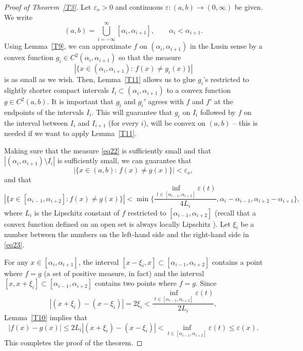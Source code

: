 \documentclass[intlimits,12pt,reqno]{amsart}
\newcommand{\eps}{\varepsilon}
\theoremstyle{definition}
\begin{document}
\begin{proof}[Proof of Theorem~\ref{T3}]
Let $\eps_o>0$ and continuous $\eps:(a,b)\to (0,\infty)$ be given. We write
$$
(a,b)=\bigcup_{i=-\infty}^\infty [\alpha_i,\alpha_{i+1}],
\qquad
\alpha_i<\alpha_{i+1}.
$$
Using Lemma~\ref{T9}, we can approximate $f$ on $(\alpha_i,\alpha_{i+1})$ in the Lusin sense by a convex function $g_i\in C^2(\alpha_i,\alpha_{i+1})$ so that the measure
\begin{equation}
\label{eq22}
|\{x\in (\alpha_i,\alpha_{i+1}):\, f(x)\neq g_i(x)\}|
\end{equation}
is as small as we wish. Then, Lemma~\ref{T11} allows us to glue $g_i$'s restricted to slightly shorter compact intervals $I_i\subset (\alpha_i,\alpha_{i+1})$ to a convex function $g\in C^2(a,b)$.
It is important that $g_i$ and $g_i'$ agrees with $f$ and $f'$ at the endpoints of the intervals $I_i$. This will guarantee that $g_i$ on $I_i$ followed by $f$ on the interval between $I_i$ and $I_{i+1}$ (for every $i$), will be convex on $(a,b)$ -- this is needed if we want to apply Lemma~\ref{T11}.

Making sure that the measure \eqref{eq22} is sufficiently small and that
$|(\alpha_i,\alpha_{i+1})\setminus I_i|$ is sufficiently small, we can guarantee that
$$
|\{x\in (a,b):\, f(x)\neq g(x)\}|<\eps_o,
$$
and that
\begin{equation}
\label{eq23}
|\{x\in [\alpha_{i-1},\alpha_{i+2}]: f(x)\neq g(x)\}|<
\min\Big\{\frac{\inf_{t\in [\alpha_{i-1},\alpha_{i+2}]}\eps(t)}{4 L_i},
\alpha_i-\alpha_{i-1}, \alpha_{i+2}-\alpha_{i+1}\Big\},
\end{equation}
where $L_i$ is the Lipschitz constant of $f$ restricted to $[\alpha_{i-1},\alpha_{i+2}]$ (recall that a convex function defined on an open set is always locally Lipschitz \cite[Theorem 3.1.2]{HiriartUrruty}).
Let $\xi_i$ be a number between the numbers on the left-hand side and the right-hand side in \eqref{eq23}.

For any $x\in [\alpha_i,\alpha_{i+1}]$, the interval $[x-\xi_i,x]\subset [\alpha_{i-1},\alpha_{i+2}]$ contains a point where $f=g$ (a set of positive measure, in fact) and the interval $[x,x+\xi_i]\subset [\alpha_{i-1},\alpha_{i+2}]$ contains two points where $f=g$.
Since
$$
|(x+\xi_i)-(x-\xi_i)|=2\xi_i<\frac{\inf_{t\in [\alpha_{i-1},\alpha_{i+2}]}\eps(t)}{2 L_i},
$$
Lemma~\ref{T10} implies that
$$
|f(x)-g(x)|\leq 2L_i|(x+\xi_i)-(x-\xi_i)|<\inf_{t\in [\alpha_{i-1},\alpha_{i+2}]}\eps(t)\leq \eps(x).
$$
This completes the proof of the theorem.
\end{proof}
\end{document}
